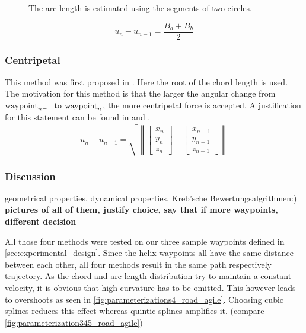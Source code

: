 \begin{figure}[h]
\centering
\def\svgwidth{0.7\textwidth}

\caption{The arc length is estimated using the segments of two circles.}
\label{fig:arcLength}
\end{figure}

\begin{equation*}
u_n-u_{n-1}=\frac{B_a+B_b}{2}
\end{equation*}

\subsubsection{Centripetal}
This method was first proposed in \cite{lee}. Here the root of the chord length is used. The motivation for this method is that the larger the angular change from $\textnormal{waypoint}_{n-1}$ to $\textnormal{waypoint}_n$, the more centripetal force is accepted. A justification for this statement can be found in \cite{doessegger} and \cite{lee}.
\begin{equation*}
u_n-u_{n-1}=\sqrt{\left \| \begin{bmatrix}x_n\\y_n\\z_n \end{bmatrix}-\begin{bmatrix}x_{n-1}\\y_{n-1}\\z_{n-1} \end{bmatrix}\right \|}
\end{equation*}

\subsubsection{Discussion}

geometrical properties, dynamical properties, Kreb'sche Bewertungsalgrithmen:) \textbf{pictures of all of them, justify choice, say that if more waypoints, different decision}

All those four methods were tested on our three sample waypoints defined in \ref{sec:experimental_design}. Since the helix waypoints all have the same distance between each other, all four methods result in the same path respectively trajectory. As the chord and arc length distribution try to maintain a constant velocity, it is obvious that high curvature has to be omitted. This however leads to overshoots as seen in \ref{fig:parameterizations4_road_agile}. Choosing cubic splines reduces this effect whereas quintic splines amplifies it. (compare \ref{fig:parameterization345_road_agile})

